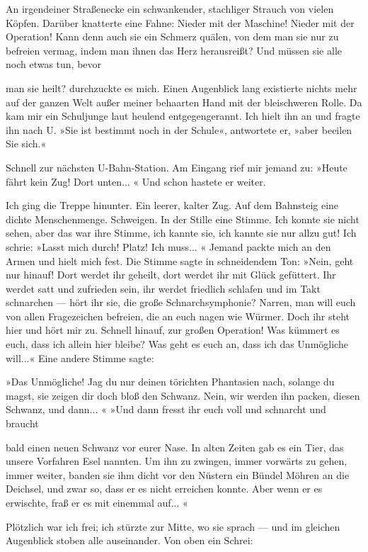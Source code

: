 An irgendeiner Straßenecke ein schwankender, stachliger Strauch von
vielen Köpfen. Darüber knatterte eine Fahne: Nieder mit der
Maschine! Nieder mit der Operation! Kann denn auch sie ein Schmerz
quälen, von dem man sie nur zu befreien vermag, indem man ihnen das
Herz herausreißt? Und müssen sie alle noch etwas tun, bevor

man sie heilt? durchzuckte es mich. Einen Augenblick lang
existierte nichts mehr auf der ganzen Welt außer meiner behaarten
Hand mit der bleischweren Rolle. Da kam mir ein Schuljunge laut
heulend entgegengerannt. Ich hielt ihn an und fragte ihn nach U.
»Sie ist bestimmt noch in der Schule«, antwortete er, »aber beeilen
Sie sich.«

Schnell zur nächsten U-Bahn-Station. Am Eingang rief mir jemand zu:
»Heute fährt kein Zug! Dort unten... « Und schon hastete er
weiter.

Ich ging die Treppe hinunter. Ein leerer, kalter Zug. Auf dem
Bahnsteig eine dichte Menschenmenge. Schweigen. In der Stille eine
Stimme. Ich konnte sie nicht sehen, aber das war ihre Stimme, ich
kannte sie, ich kannte sie nur allzu gut! Ich schrie: »Lasst mich
durch! Platz! Ich muss... « Jemand packte mich an den Armen und
hielt mich fest. Die Stimme sagte in schneidendem Ton: »Nein, geht
nur hinauf! Dort werdet ihr geheilt, dort werdet ihr mit Glück
gefüttert. Ihr werdet satt und zufrieden sein, ihr werdet friedlich
schlafen und im Takt schnarchen — hört ihr sie, die große
Schnarchsymphonie? Narren, man will euch von allen Fragezeichen
befreien, die an euch nagen wie Würmer. Doch ihr steht hier und
hört mir zu. Schnell hinauf, zur großen Operation! Was kümmert es
euch, dass ich allein hier bleibe? Was geht es euch an, dass ich
das Unmögliche will...« Eine andere Stimme sagte:

»Das Unmögliche! Jag du nur deinen törichten Phantasien nach,
solange du magst, sie zeigen dir doch bloß den Schwanz. Nein, wir
werden ihn packen, diesen Schwanz, und dann... « »Und dann fresst
ihr euch voll und schnarcht und braucht

bald einen neuen Schwanz vor eurer Nase. In alten Zeiten gab es ein
Tier, das unsere Vorfahren Esel nannten. Um ihn zu zwingen, immer
vorwärts zu gehen, immer weiter, banden sie ihm dicht vor den
Nüstern ein Bündel Möhren an die Deichsel, und zwar so, dass er es
nicht erreichen konnte. Aber wenn er es erwischte, fraß er es mit
einemmal auf... «

Plötzlich war ich frei; ich stürzte zur Mitte, wo sie sprach — und
im gleichen Augenblick stoben alle auseinander. Von oben ein
Schrei:

